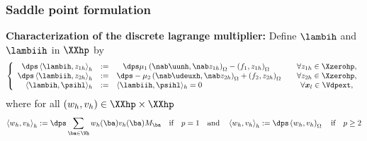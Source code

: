 \documentclass[aspectratio=169]{beamer}
\begin{document}
\begin{frame}
\frametitle{Saddle point formulation}
\textcolor{cadmiumgreen}{\textbf{Characterization of the discrete lagrange multiplier:}}
Define $\lambih$ and $\lambiih$ in $\XXhp$ by
\begin{equation*}
\left\lbrace\begin{array}{rclcc}
\dps \left\langle \lambih,z_{1h}\right\rangle _h&\egaldef& \hspace{0.8em}
\dps \mu_1 \left(\nab \uunh, \nab z_{1h}\right)_{\Omega} - \left(f_1, z_{1h}\right)_{\Omega} \quad &\forall z_{1h} \in \Xzerohp,\\
\dps \left\langle \lambiih,z_{2h}\right\rangle _h&\egaldef& \dps
-\mu_2 \left(\nab \udeuxh, \nab z_{2h}\right)_{\Omega} + \left(f_2, z_{2h}\right)_{\Omega} \quad &\forall z_{2h} \in \Xzerohp,\\
\langle \lambih,\psihl \rangle_h &\egaldef &\langle \lambiih,\psihl \rangle_h =0  \quad &\forall \xl \in \Vdpext, \\
\end{array}
\right. 
\end{equation*}
where for all $\left(w_h ,v_h\right) \in \XXhp \times \XXhp$
\begin{equation*}
\left\langle w_h ,v_h \right\rangle_h \egaldef \dps \sum_{\ba \in \Vh} w_h(\ba) v_h(\ba) \Ma  \quad \mbox{if} \quad p=1 \quad \mbox{and} \quad \left \langle w_h ,v_h \right\rangle_h  \egaldef \dps \left(w_h, v_h\right)_{\Omega} \quad \mbox{if} \quad p \geq 2
\end{equation*}
\end{frame} 
%
\end{document}
